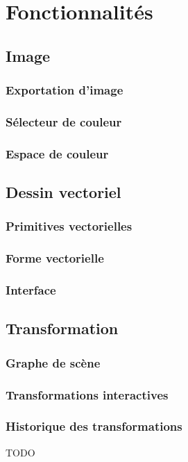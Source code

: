 \chapter{Fonctionnalités}
\label{s:fonctionnalités}

\section{Image}
\subsection{Exportation d'image}
\subsection{Sélecteur de couleur}
\subsection{Espace de couleur}

\section{Dessin vectoriel}
\subsection{Primitives vectorielles}
\subsection{Forme vectorielle}
\subsection{Interface}

\section{Transformation}
\subsection{Graphe de scène}
\subsection{Transformations interactives}
\subsection{Historique des transformations}
TODO

